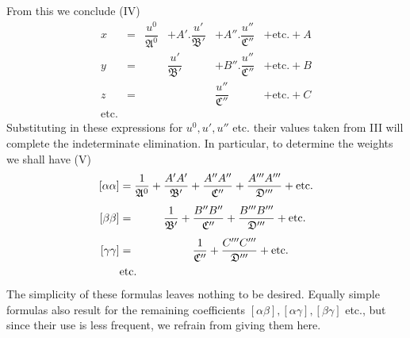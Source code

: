 From this we conclude (IV)
\[
\begin{array}{rcllll}
x&=&\dfrac{u^0}{\mathfrak{A}^0}&+A'.\dfrac{u'}{\mathfrak{B}'}&+A''.\dfrac{u''}{\mathfrak{C}''}&+\text{etc.}+A\\[7pt]
y&=&&\dfrac{u'}{\mathfrak{B}'}&+B''.\dfrac{u''}{\mathfrak{C}''}&+\text{etc.}+B\\[7pt]
z&=&&&\dfrac{u''}{\mathfrak{C}''}&+\text{etc.}+C\\[4pt]
\text{etc.}
\end{array}
\]
Substituting in these expressions for \(u^0,u',u''\) etc. their values taken from III will complete the indeterminate elimination. In particular, to determine the weights we shall have (V)
\[
\begin{aligned}
\relax[\alpha\alpha]&=\frac1{\mathfrak{A}^0}+\frac{A'A'}{\mathfrak{B}'}+\frac{A''A''}{\mathfrak{C}''}+\frac{A'''A'''}{\mathfrak{D}'''}+\text{etc.}\\[4pt]
[\beta\beta]&=\phantom{\frac1{\mathfrak{A}^0}+{}}\frac1{\mathfrak{B}'}+\frac{B''B''}{\mathfrak{C}''}+\frac{B'''B'''}{\mathfrak{D}'''}+\text{etc.}\\[4pt]
[\gamma\gamma]&=\phantom{\frac1{\mathfrak{A}^0}+\frac1{\mathfrak{B}'}+{}}\frac1{\mathfrak{C}''}+\frac{C'''C'''}{\mathfrak{D}'''}+\text{etc.}\\
&\text{etc.}
\end{aligned}
\]
The simplicity of these formulas leaves nothing to be desired. Equally simple formulas also result for the remaining
%
coefficients \([\alpha\beta],[\alpha\gamma],[\beta\gamma]\) etc., but since their use is less frequent, we refrain from giving them here.

\clearpage
